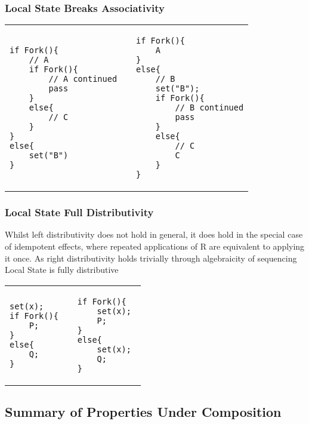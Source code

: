 \documentclass[logo,bsc,singlespacing,parskip]{infthesis}
\begin{document}
\subsubsection*{Local State Breaks Associativity}
\begin{table}[H]
\centering
\begin{tabular}{p{} c p{}}
\begin{lstlisting}
if Fork(){
    // A
    if Fork(){
        // A continued
        pass
    }
    else{
        // C
    }
}
else{
    set("B")
}
\end{lstlisting}
&
&
\begin{lstlisting}
if Fork(){
    A
} 
else{
    // B
    set("B");
    if Fork(){
        // B continued
        pass
    }
    else{
        // C
        C
    }
}
\end{lstlisting}
\end{tabular}
\end{table}
\vspace{-2em}


\subsubsection*{Local State Full Distributivity}
Whilst left distributivity does not hold in general, it does hold in the special case of idempotent effects, where repeated applications of R are equivalent to applying it once. As right distributivity holds trivially through algebraicity of sequencing Local State is fully distributive 

\vspace{-2em}
\begin{table}[H]
\centering
\begin{tabular}{p{} c p{}}
\begin{lstlisting}
set(x);
if Fork(){
    P;
}
else{
    Q;
}
\end{lstlisting}
&
&
\begin{lstlisting}
if Fork(){
    set(x); 
    P;
}
else{ 
    set(x); 
    Q;
}
\end{lstlisting}
\end{tabular}
\end{table}
\vspace{-2em}


\subsection{Summary of Properties Under Composition}
\end{document}
